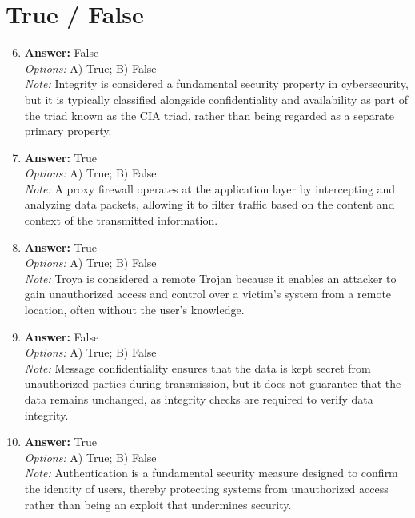 \documentclass[12pt]{article}
\begin{document}
\section*{True / False}
\begin{enumerate}[label=\arabic*.]
\setcounter{enumi}{5}
\item \textbf{Answer:} False
\\ \textit{Options:} A) True; B) False
\\ \textit{Note:} Integrity is considered a fundamental security property in cybersecurity, but it is typically classified alongside confidentiality and availability as part of the triad known as the CIA triad, rather than being regarded as a separate primary property.
\item \textbf{Answer:} True
\\ \textit{Options:} A) True; B) False
\\ \textit{Note:} A proxy firewall operates at the application layer by intercepting and analyzing data packets, allowing it to filter traffic based on the content and context of the transmitted information.
\item \textbf{Answer:} True
\\ \textit{Options:} A) True; B) False
\\ \textit{Note:} Troya is considered a remote Trojan because it enables an attacker to gain unauthorized access and control over a victim's system from a remote location, often without the user's knowledge.
\item \textbf{Answer:} False
\\ \textit{Options:} A) True; B) False
\\ \textit{Note:} Message confidentiality ensures that the data is kept secret from unauthorized parties during transmission, but it does not guarantee that the data remains unchanged, as integrity checks are required to verify data integrity.
\item \textbf{Answer:} True
\\ \textit{Options:} A) True; B) False
\\ \textit{Note:} Authentication is a fundamental security measure designed to confirm the identity of users, thereby protecting systems from unauthorized access rather than being an exploit that undermines security.
\end{enumerate}
\end{document}
